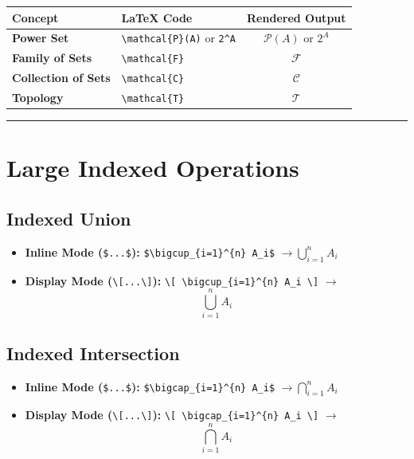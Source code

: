 \documentclass[11pt]{article}
\begin{document}
\begin{table}[H]
\centering
\begin{tabular}{llc}
\toprule
\textbf{Concept} & \textbf{\LaTeX{} Code} & \textbf{Rendered Output} \\
\midrule
\textbf{Power Set} & \verb|\mathcal{P}(A)| or \verb|2^A| & $\mathcal{P}(A)$ or $2^A$ \\
\textbf{Family of Sets} & \verb|\mathcal{F}| & $\mathcal{F}$ \\
\textbf{Collection of Sets} & \verb|\mathcal{C}| & $\mathcal{C}$ \\
\textbf{Topology} & \verb|\mathcal{T}| & $\mathcal{T}$ \\
\bottomrule
\end{tabular}
\end{table}

\vspace{1em}
\noindent\rule{\textwidth}{0.4pt}

\section*{\textbf{\Large Large Indexed Operations}}

\subsection*{Indexed Union}
\begin{itemize}
    \item \textbf{Inline Mode (}\verb|$...$|\textbf{):} \verb|$\bigcup_{i=1}^{n} A_i$| $\rightarrow \bigcup_{i=1}^{n} A_i$
    \item \textbf{Display Mode (}\verb|\[...\]|\textbf{):} \verb|\[ \bigcup_{i=1}^{n} A_i \]| $\rightarrow$ \[ \bigcup_{i=1}^{n} A_i \]
\end{itemize}

\subsection*{Indexed Intersection}
\begin{itemize}
    \item \textbf{Inline Mode (}\verb|$...$|\textbf{):} \verb|$\bigcap_{i=1}^{n} A_i$| $\rightarrow \bigcap_{i=1}^{n} A_i$
    \item \textbf{Display Mode (}\verb|\[...\]|\textbf{):} \verb|\[ \bigcap_{i=1}^{n} A_i \]| $\rightarrow$ \[ \bigcap_{i=1}^{n} A_i \]
\end{itemize}
\end{document}
